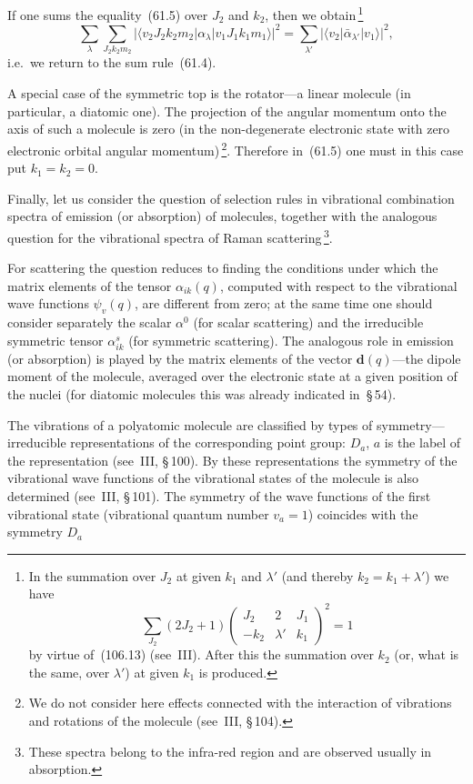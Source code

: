 If one sums the equality~(61.5) over $J_2$ and $k_2$, then we obtain\,\footnote{In the summation over $J_2$ at given $k_1$ and $\lambda'$ (and thereby $k_2 = k_1 + \lambda'$) we have
\[
\sum_{J_2}(2J_2+1)\begin{pmatrix}J_2 & 2 & J_1\\-k_2 & \lambda' & k_1\end{pmatrix}^{\!2} = 1
\]
by virtue of~(106.13) (see~III). After this the summation over $k_2$ (or, what is the same, over $\lambda'$) at given $k_1$ is produced.}
\[
\sum_\lambda\sum_{J_2 k_2 m_2}|\langle v_2 J_2 k_2 m_2|\alpha_\lambda|v_1 J_1 k_1 m_1\rangle|^2 = \sum_{\lambda'}|\langle v_2|\bar{\alpha}_{\lambda'}|v_1\rangle|^2,
\]
i.e.\ we return to the sum rule~(61.4).

A special case of the symmetric top is the rotator---a linear molecule (in particular, a diatomic one). The projection of the angular momentum onto the axis of such a molecule is zero (in the non-degenerate electronic state with zero electronic orbital angular momentum)\,\footnote{We do not consider here effects connected with the interaction of vibrations and rotations of the molecule (see~III, \S\,104).}. Therefore in~(61.5) one must in this case put $k_1 = k_2 = 0$.

Finally, let us consider the question of selection rules in vibrational combination spectra of emission (or absorption) of molecules, together with the analogous question for the vibrational spectra of Raman scattering\,\footnote{These spectra belong to the infra-red region and are observed usually in absorption.}.

For scattering the question reduces to finding the conditions under which the matrix elements of the tensor $\alpha_{ik}(q)$, computed with respect to the vibrational wave functions $\psi_v(q)$, are different from zero; at the same time one should consider separately the scalar $\alpha^0$ (for scalar scattering) and the irreducible symmetric tensor $\alpha^s_{ik}$ (for symmetric scattering). The analogous role in emission (or absorption) is played by the matrix elements of the vector $\mathbf{d}(q)$---the dipole moment of the molecule, averaged over the electronic state at a given position of the nuclei (for diatomic molecules this was already indicated in~\S\,54).

The vibrations of a polyatomic molecule are classified by types of symmetry---irreducible representations of the corresponding point group: $D_a$, $a$ is the label of the representation (see~III, \S\,100). By these representations the symmetry of the vibrational wave functions of the vibrational states of the molecule is also determined (see~III, \S\,101). The symmetry of the wave functions of the first vibrational state (vibrational quantum number $v_a = 1$) coincides with the symmetry $D_a$

